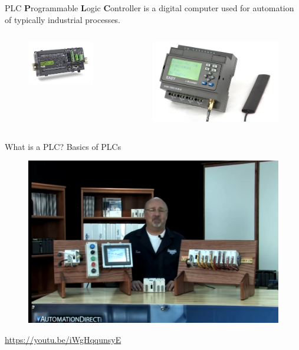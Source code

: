 \begin{frame}{PLC}
	\textbf{P}rogrammable \textbf{L}ogic \textbf{C}ontroller is a digital computer used for automation of typically industrial processes. 
	\begin{columns}
		\begin{column}{0.5\textwidth}
			\begin{figure}
\centering
\includegraphics[width=0.7\linewidth]{img/PLC_1}
\end{figure}

		\end{column}
		\begin{column}{0.5\textwidth}
\begin{figure}
\centering
\includegraphics[width=0.7\linewidth]{img/PLC_2}

\end{figure}

		\end{column}
	\end{columns}
	
\end{frame}
\begin{frame}{What is a PLC? Basics of PLCs}
	\begin{figure}
\centering
\includegraphics[width=0.7\linewidth]{img/what_is_a_plc}
\end{figure}

	\url{https://youtu.be/iWgHqqunsyE}
\end{frame}
